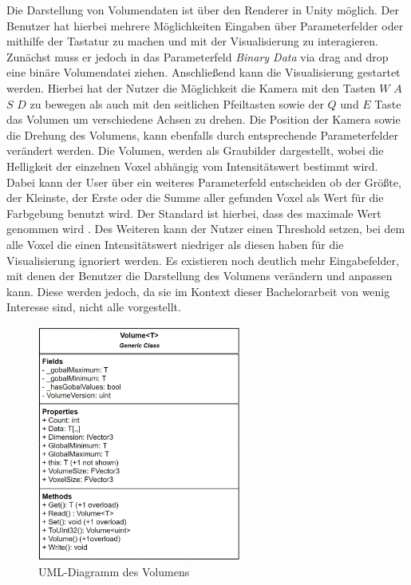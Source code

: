Die Darstellung von Volumendaten ist über den Renderer in Unity möglich. Der Benutzer hat hierbei mehrere Möglichkeiten Eingaben über Parameterfelder oder mithilfe der Tastatur zu machen und mit der Visualisierung zu interagieren. Zunächst muss er jedoch in das Parameterfeld \textit{Binary Data} via drag and drop eine binäre Volumendatei ziehen.
Anschließend kann die Visualisierung gestartet werden. Hierbei hat der Nutzer die Möglichkeit die Kamera mit den Tasten $W$ $A$ $S$ $D$ zu bewegen als auch mit den seitlichen Pfeiltasten sowie der $Q$ und $E$ Taste das Volumen um verschiedene Achsen zu drehen. Die Position der Kamera sowie die Drehung des Volumens, kann ebenfalls durch entsprechende Parameterfelder verändert werden.
Die Volumen, werden als Graubilder dargestellt, wobei die Helligkeit der einzelnen Voxel abhängig vom Intensitätswert bestimmt wird. Dabei kann der User über ein weiteres Parameterfeld entscheiden ob der Größte, der Kleinste, der Erste oder die Summe aller gefunden Voxel als Wert für die Farbgebung benutzt wird. Der Standard ist hierbei, dass des maximale Wert genommen wird .
\newline
Des Weiteren kann der Nutzer einen Threshold setzen, bei dem alle Voxel die einen Intensitätswert niedriger als diesen haben für die Visualisierung ignoriert werden.
Es existieren noch deutlich mehr Eingabefelder, mit denen der Benutzer die Darstellung des Volumens verändern und anpassen kann. Diese werden jedoch, da sie im Kontext dieser Bachelorarbeit von wenig Interesse sind, nicht alle vorgestellt.


\begin{figure}
\centering
\includegraphics[width=0.6\textwidth]{Logos/Volume_UML.PNG}
\caption{UML-Diagramm des Volumens} 
\label{fig:volume_uml} 
\end{figure}



